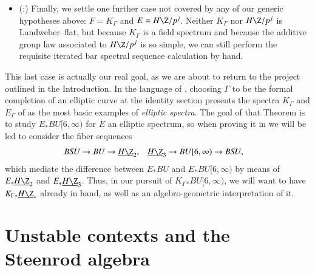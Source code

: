 \begin{itemize}
\begin{align*}
\CatOf{Spectra} & \xrightarrow{\Loops^\infty} \CatOf{Loopspaces} \\
& \xrightarrow{\HFp_*} \CatOf{GradedHopfAlgebras}^{>0, \fin}_{\F_p/} \\
& \xrightarrow{D_*} \CatOf{GradedDMods} \\
& \subseteq \CatOf{GradedModules}_{\Cart}
\end{align*}
gives a homological functor.  This means that the Dieudonn\'e module associated to an infinite loopspace varies stably with the spectrum underlying the loopspace, which is enough leverage to the settle the case where $E$ is any Landweber--flat theory.
\item (:) Finally, we settle one further case not covered by any of our generic hypotheses above: $F = K_\Gamma$ and $E = H\Z/p^j$.  Neither $K_\Gamma$ nor $H\Z/p^j$ is Landweber--flat, but because $K_\Gamma$ is a field spectrum and because the additive group law associated to $H\Z/p^j$ is so simple, we can still perform the requisite iterated bar spectral sequence calculation by hand.
\end{itemize}

This last case is actually our real goal, as we are about to return to the project outlined in the Introduction.  In the language of , choosing $\Gamma$ to be the formal completion of an elliptic curve at the identity section presents the spectra $K_\Gamma$ and $E_\Gamma$ of  as the most basic examples of \textit{elliptic spectra}.  The goal of that Theorem is to study $E_* BU[6, \infty)$ for $E$ an elliptic spectrum, so when proving it in  we will be led to consider the fiber sequences
\begin{align*}
B\SU \to BU & \to \OS{H\Z}{2}, & \OS{H\Z}{3} \to BU[6, \infty) & \to B\SU,
\end{align*}
which mediate the difference between $E_* BU$ and $E_* BU[6, \infty)$ by means of $E_* \OS{H\Z}{2}$ and $E_* \OS{H\Z}{3}$.  Thus, in our pursuit of $K_\Gamma{}_* BU[6, \infty)$, we will want to have $K_\Gamma{}_* \OS{H\Z}{*}$ already in hand, as well as an algebro-geometric interpretation of it.









\section{Unstable contexts and the Steenrod algebra}\label{UnstableContextsSection}

